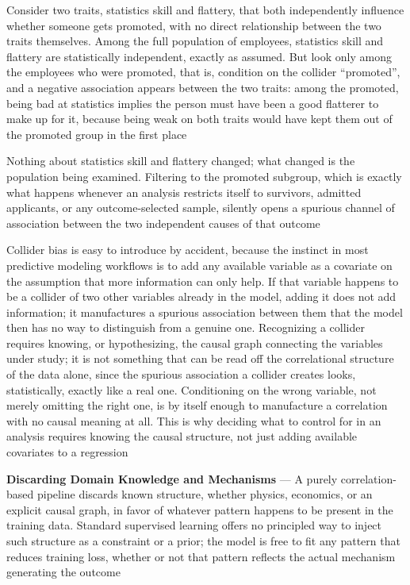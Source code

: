 Consider two traits, statistics skill and flattery, that both independently
influence whether someone gets promoted, with no direct relationship between the
two traits themselves. Among the full population of employees, statistics skill and
flattery are statistically independent, exactly as assumed. But look only among the
employees who were promoted, that is, condition on the collider ``promoted'',
and a negative association appears between the two traits: among the promoted,
being bad at statistics implies the person must have been a good flatterer to
make up for it, because being weak on both traits would have kept them out of the
promoted group in the first place

Nothing about statistics skill and flattery changed; what changed is the population
being examined. Filtering to the promoted subgroup, which is exactly what happens
whenever an analysis restricts itself to survivors, admitted applicants, or any outcome-selected
sample, silently opens a spurious channel of association between the two
independent causes of that outcome

Collider bias is easy to introduce by accident, because the instinct in most
predictive modeling workflows is to add any available variable as a covariate on
the assumption that more information can only help. If that variable happens to be
a collider of two other variables already in the model, adding it does not add
information; it manufactures a spurious association between them that the model then
has no way to distinguish from a genuine one. Recognizing a collider requires
knowing, or hypothesizing, the causal graph connecting the variables under study;
it is not something that can be read off the correlational structure of the data
alone, since the spurious association a collider creates looks, statistically,
exactly like a real one. Conditioning on the wrong variable, not merely omitting
the right one, is by itself enough to manufacture a correlation with no causal meaning
at all. This is why deciding what to control for in an analysis requires knowing
the causal structure, not just adding available covariates to a regression

\textbf{Discarding Domain Knowledge and Mechanisms} --- A purely correlation-based
pipeline discards known structure, whether physics, economics, or an explicit
causal graph, in favor of whatever pattern happens to be present in the training
data. Standard supervised learning offers no principled way to inject such
structure as a constraint or a prior; the model is free to fit any pattern that reduces
training loss, whether or not that pattern reflects the actual mechanism
generating the outcome

